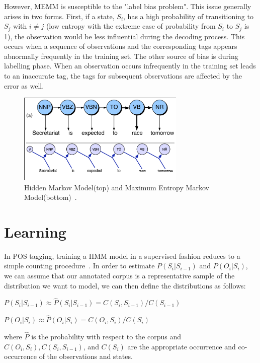 \documentclass{acm_proc_article-sp}
\begin{document}
However, MEMM is susceptible to the "label bias problem". This issue generally arises in two forms. First, if a state, $S_i$, has a high probability of transitioning to $S_j$ with $i \neq j$ (low entropy with the extreme case of probability from $S_i$ to $S_j$ is 1), the observation would be less influential during the decoding process. This occurs when a sequence of observations and the corresponding tags appears abnormally frequently in the training set. The other source of bias is during labelling phase. When an observation occurs infrequently in the training set leads to an inaccurate tag, the tags for subsequent observations are affected by the error as well. \cite{labelBiasProblem}

\begin{figure}[ht]
\centering
\includegraphics[width=80mm]{figures/memm.png}
\caption{Hidden Markov Model(top) and Maximum Entropy Markov Model(bottom)~\cite{nlpBook}. \label{hmmVmemm}}
\end{figure}

\section{Learning}
In POS tagging, training a HMM model in a supervised fashion reduces to a simple counting procedure~\cite{nlpBook}. In order to estimate $P( S_i | S_{i-1} )$ and $P( O_i | S_i )$, we can assume that our annotated corpus is a representative sample of the distribution we want to model, we can then define the distributions as follows:

$P( S_i | S_{i-1} ) \approx \hat{P}( S_i | S_{i-1} ) = C( S_i, S_{i-1} )/C( S_{i-1} )$

$P( O_i | S_i ) \approx \hat{P}( O_i | S_i ) = C( O_i, S_i )/C( S_i )$

where $\hat{P}$ is the probability with respect to the corpus and $C( O_i, S_i ), C( S_i, S_{i-1} )$, and $C( S_i )$ are the appropriate occurrence and co-occurrence of the observations and states.
\end{document}
